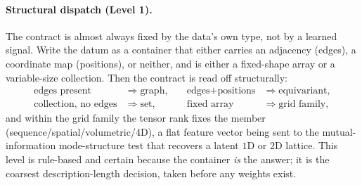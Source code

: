 \documentclass[11pt]{article}
\theoremstyle{definition}
\begin{document}
\paragraph{Structural dispatch (Level 1).} The contract is almost always fixed by the data's own type,
not by a learned signal. Write the datum as a container that either carries an adjacency (edges), a
coordinate map (positions), or neither, and is either a fixed-shape array or a variable-size
collection. Then the contract is read off structurally:
\begin{equation}
\begin{aligned}
\text{edges present}&\Rightarrow\text{graph}, &\quad
\text{edges}+\text{positions}&\Rightarrow\text{equivariant},\\
\text{collection, no edges}&\Rightarrow\text{set}, &\quad
\text{fixed array}&\Rightarrow\text{grid family},
\end{aligned}
\end{equation}
and within the grid family the tensor rank fixes the member (sequence/spatial/volumetric/$4$D), a flat
feature vector being sent to the mutual-information mode-structure test that recovers a latent
$1$D or $2$D lattice. This level is rule-based and certain because the container \emph{is} the answer;
it is the coarsest description-length decision, taken before any weights exist.
\end{document}
